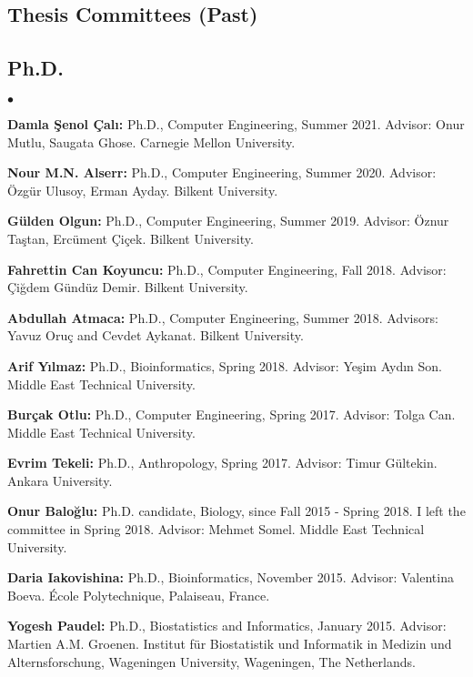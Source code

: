 \documentclass[margin,line]{res}
\newenvironment{list2}{
  \begin{list}{$\bullet$}{%
      \setlength{\itemsep}{0.1cm}
      \setlength{\parsep}{0in} \setlength{\parskip}{0in}
      \setlength{\topsep}{0in} \setlength{\partopsep}{0in} 
      \setlength{\leftmargin}{0.2in}}}{\end{list}}
\begin{document}
\begin{resume}
\section{\sc Thesis Committees (Past)}

\vspace*{-.4cm}
\subsection{\small \sc Ph.D.}
\begin{list2}
\item 
{\bf Damla Şenol Çalı:} Ph.D., Computer Engineering, Summer 2021. Advisor: Onur Mutlu, Saugata Ghose. Carnegie Mellon University.
\item 
{\bf  Nour M.N. Alserr:} Ph.D., Computer Engineering, Summer 2020.
  Advisor: Özgür Ulusoy, Erman Ayday.
  Bilkent University.
\item
  {\bf Gülden Olgun:} Ph.D., Computer Engineering, Summer 2019.
  Advisor: Öznur Taştan, Ercüment Çiçek.
  Bilkent University.
\item
  {\bf Fahrettin Can Koyuncu:} Ph.D., Computer Engineering, Fall 2018.
  Advisor: Çiğdem Gündüz Demir.
  Bilkent University.
\item
  {\bf Abdullah Atmaca:} Ph.D., Computer Engineering, Summer 2018.
  Advisors: Yavuz Oruç and Cevdet Aykanat.
  Bilkent University.
\item
  {\bf Arif Yılmaz:} Ph.D., Bioinformatics, Spring 2018.
  Advisor: Yeşim Aydın Son.
  Middle East Technical University.
\item 
  {\bf Burçak Otlu:} Ph.D., Computer Engineering, Spring 2017.
  Advisor: Tolga Can.
  Middle East Technical University. 
\item 
  {\bf Evrim Tekeli:} Ph.D., Anthropology,  Spring 2017.
  Advisor: Timur G\"{u}ltekin.
  Ankara University. 
\item
  {\bf Onur Baloğlu:} Ph.D. candidate, Biology, since Fall 2015 - Spring 2018. I left the committee in Spring 2018.
  Advisor: Mehmet Somel.
  Middle East Technical University.
\item
  {\bf Daria Iakovishina:} Ph.D., Bioinformatics,  November 2015.
  Advisor:  Valentina Boeva.
  École Polytechnique, Palaiseau, France.
\item
  {\bf Yogesh Paudel:} Ph.D., Biostatistics and Informatics,  January 2015.
  Advisor: Martien A.M. Groenen.
  Institut für Biostatistik und Informatik in Medizin und Alternsforschung,  Wageningen University, Wageningen, The Netherlands.
  

\end{list2}
\end{resume}
\end{document}
